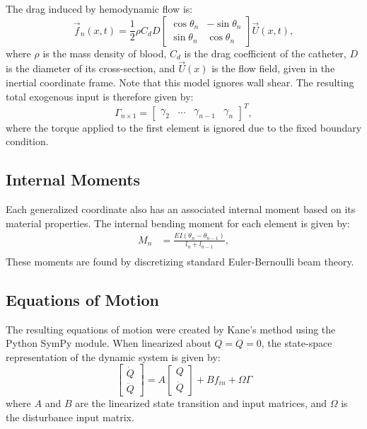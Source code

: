 \documentclass[letterpaper,10pt,conference]{ieeeconf}   %
\begin{document}
The drag induced by hemodynamic flow is:
%
\begin{equation}
\vec{f}_n(x,t) = \frac{1}{2}\rho C_d D 
\begin{bmatrix}
\cos{\theta_n} & -\sin{\theta_n} \\
\sin{\theta_n} & \cos{\theta_n}
\end{bmatrix}
\vec{U}(x,t),
\end{equation}
where $\rho$ is the mass density of blood, $C_d$ is the drag coefficient of the catheter, $D$ is the diameter of its cross-section, and $\vec{U}(x)$ is the flow field, given in the inertial coordinate frame. Note that this model ignores wall shear. The resulting total exogenous input is therefore given by:
%
\begin{equation}
\label{eq:Gamma}
\Gamma_{n \times 1} = 
\begin{bmatrix}
\gamma_{2} &  
\dots & 
\gamma_{n-1} & 
\gamma_{n}
\end{bmatrix}^T,
\end{equation}
%
where the torque applied to the first element is ignored due to the fixed boundary condition.

\subsection{Internal Moments}
\label{sec:internal_forces}

Each generalized coordinate also has an associated internal moment based on its material properties. The internal bending moment for each element is given by:
%
\begin{equation}
\begin{aligned}
\label{eq:m_z}
M_{n} &= \frac{EI (\theta_{n} - \theta_{n-1})}{l_n + l_{n-1}}, \\
\end{aligned}
\end{equation}
%
These moments are found by discretizing standard Euler-Bernoulli beam theory. 

\subsection{Equations of Motion}
\label{sec:equationsmotion}

The resulting equations of motion were created by Kane's method using the Python SymPy module. When linearized about $Q=\dot{Q}=0$, the state-space representation of the dynamic system is given by:
%
\begin{equation}
\label{eq:eqmotion}
\begin{bmatrix}
 \dot{Q}\\
 \ddot{Q}
\end{bmatrix}
=
A
\begin{bmatrix}
 Q\\
 \dot{Q}
\end{bmatrix}
+
B f_{in}
+
\Omega \Gamma

\end{equation} 
%
where $A$ and $B$ are the linearized state transition and input matrices, and $\Omega$ is the disturbance input matrix.  
\end{document}
